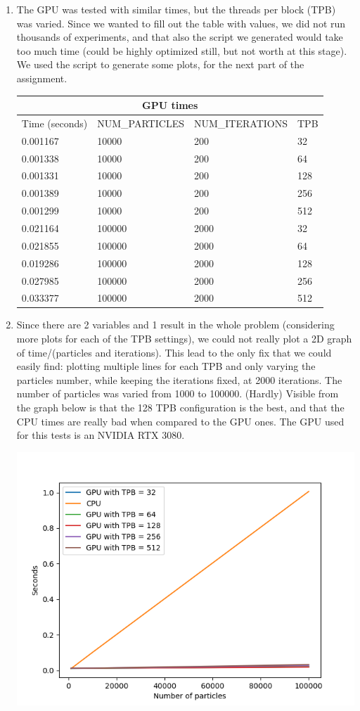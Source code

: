 \documentclass[english]{exam}
\begin{document}
\begin{enumerate}
\item The GPU was tested with similar times, but the threads per block (TPB) was varied. Since we wanted to fill out the table with values, we did not run thousands of experiments, and that also the script we generated would take too much time (could be highly optimized still, but not worth at this stage). We used the script to generate some plots, for the next part of the assignment.\\
  \begin{tabular}{ |p{3cm}||p{3cm}|p{3cm}|p{3cm}|  }
    \hline
    \multicolumn{4}{|c|}{GPU times} \\
    \hline
    Time (seconds)& NUM\_PARTICLES& NUM\_ITERATIONS&TPB\\
    \hline
    0.001167& 10000& 200& 32\\
    0.001338& 10000& 200& 64\\
    0.001331& 10000& 200& 128\\
    0.001389& 10000& 200& 256\\
    0.001299& 10000& 200& 512\\
    0.021164& 100000& 2000& 32\\
    0.021855& 100000& 2000& 64\\
    0.019286& 100000& 2000& 128\\
    0.027985& 100000& 2000& 256\\
    0.033377& 100000& 2000& 512\\
    \hline
  \end{tabular}
\item Since there are 2 variables and 1 result in the whole problem (considering more plots for each of the TPB settings), we could not really plot a 2D graph of time/(particles and iterations). This lead to the only fix that we could easily find: plotting multiple lines for each TPB and only varying the particles number, while keeping the iterations fixed, at 2000 iterations. The number of particles was varied from 1000 to 100000. (Hardly) Visible from the graph below is that the 128 TPB configuration is the best, and that the CPU times are really bad when compared to the GPU ones. The GPU used for this tests is an NVIDIA RTX 3080.\\
  \begin{center}
    \includegraphics[scale=0.65]{fig.png}

\end{center}
\end{enumerate}
\end{document}
